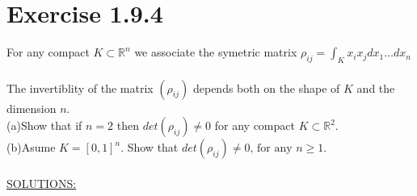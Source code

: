 \documentclass{report}
\begin{document}
\section*{Exercise 1.9.4}


For any compact $K \subset \mathbb{R}^n$ we associate the symetric matrix $\displaystyle \rho_{ij} = \int_{K} x_i x_j d x_1 \dots d x_n$ \\
\\
The invertiblity of the matrix $(\rho_{ij})$ depends both on the shape of $K$ and the dimension $n$. \\
(a)Show that if $n = 2$ then $det(\rho_{ij}) \neq 0$ for any compact $K \subset \mathbb{R}^2$.\\
(b)Asume $K = [0,1]^n$. Show that $det(\rho_{ij}) \neq 0 \text{, for any $n \geq 1$}$.
\\
\\
\underline{SOLUTIONS:}
\end{document}
